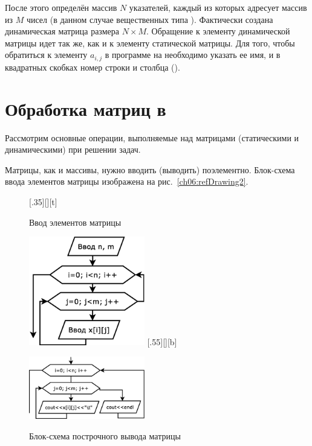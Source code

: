 После этого определён массив $N$ указателей, каждый из которых адресует массив из $M$ чисел (в данном
случае вещественных типа ). Фактически создана динамическая матрица размера $N\times M$.
Обращение к элементу
динамической матрицы идет так же, как и к элементу статической матрицы. Для того, чтобы обратиться к элементу 
$a_{i,j}$ в программе на  необходимо указать ее имя, и в квадратных скобках номер строки 
и столбца ().

\section[Обработка матриц в \Sys{С(С++)}]{Обработка матриц в }
Рассмотрим основные операции, выполняемые над матрицами (статическими и динамическими) при решении задач.

Матрицы, как и массивы, нужно вводить (выводить) поэлементно. Блок-схема ввода элементов матрицы  изображена на
рис.~\ref{ch06:refDrawing2}.

\begin{figure}[H]
\begin{floatrow}
[.35\textwidth][\FBheight][t]
{\caption{Ввод элементов матрицы}
\label{ch06:refDrawing2}}
{\includegraphics[width=0.45\textwidth,keepaspectratio]{img/ris_6_3}}\hspace*{0.05\textwidth}
%
[.55\textwidth][\FBheight][b]
{\caption{Блок-схема построчного вывода матрицы}
\label{ch06:refDrawing3}}
{\includegraphics[width=0.45\textwidth,keepaspectratio]{img/ris_6_4}}
\end{floatrow}
\end{figure}



